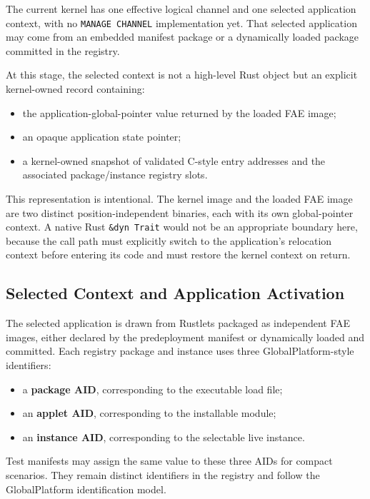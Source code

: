 The current kernel has one effective logical channel and one selected
application context, with no \texttt{MANAGE CHANNEL} implementation yet.
That selected application may come from an embedded manifest package or a
dynamically loaded package committed in the registry.

At this stage, the selected context is not a high-level Rust object but
an explicit kernel-owned record containing:
\begin{itemize}
\item the application-global-pointer value returned by the loaded FAE
  image;
\item an opaque application state pointer;
\item a kernel-owned snapshot of validated C-style entry addresses and
  the associated package/instance registry slots.
\end{itemize}

This representation is intentional. The kernel image and the loaded FAE
image are two distinct position-independent binaries, each with its own
global-pointer context. A native Rust \texttt{\&dyn Trait} would not be
an appropriate boundary here, because the call path must explicitly
switch to the application's relocation context before entering its code
and must restore the kernel context on return.

\subsection{Selected Context and Application Activation}
\label{sec:impl-selected-context}

The selected application is drawn from Rustlets packaged as independent FAE
images, either declared by the predeployment manifest or dynamically loaded
and committed. Each registry package and
instance uses three GlobalPlatform-style identifiers:
\begin{itemize}
\item a \textbf{package AID}, corresponding to the executable load file;
\item an \textbf{applet AID}, corresponding to the installable module;
\item an \textbf{instance AID}, corresponding to the selectable live
  instance.
\end{itemize}

Test manifests may assign the same value to these three AIDs for compact
scenarios. They remain distinct identifiers in the registry and follow the
GlobalPlatform identification model.

